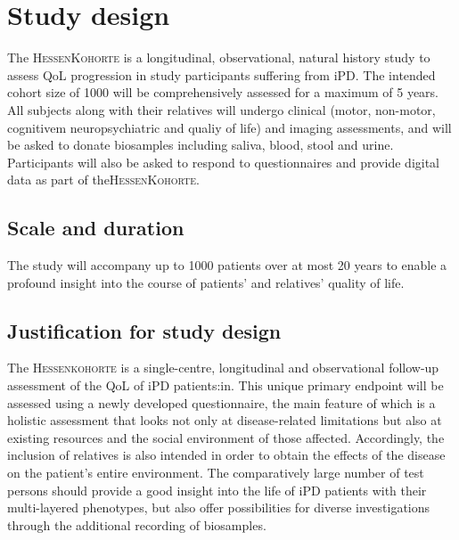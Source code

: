 
\section{Study design}
The \textsc{HessenKohorte} is a longitudinal, observational, natural history study to assess \ac{QoL} progression in study participants suffering from \ac{iPD}. The intended cohort size of \SI{1000}{} will be comprehensively assessed for a maximum of 5 years. All subjects along with their relatives will undergo clinical (motor, non-motor, cognitivem neuropsychiatric and qualiy of life) and imaging assessments, and will be asked to donate biosamples including saliva, blood, stool and urine. Participants will also be asked to respond to questionnaires and provide digital data as part of the\textsc{HessenKohorte}.

\subsection{Scale and duration}
The study will accompany up to \SI{1000}{} patients over at most 20 years to enable a profound insight into the course of patients' and relatives' quality of life.

\subsection{Justification for study design}
The \textsc{Hessenkohorte} is a single-centre, longitudinal and observational follow-up assessment of the \ac{QoL} of \ac{iPD} patients:in. This unique primary endpoint will be assessed using a newly developed questionnaire, the main feature of which is a holistic assessment that looks not only at disease-related limitations but also at existing resources and the social environment of those affected. Accordingly, the inclusion of relatives is also intended in order to obtain the effects of the disease on the patient's entire environment. The comparatively large number of test persons should provide a good insight into the life of \ac{iPD} patients with their multi-layered phenotypes, but also offer possibilities for diverse investigations through the additional recording of biosamples.

